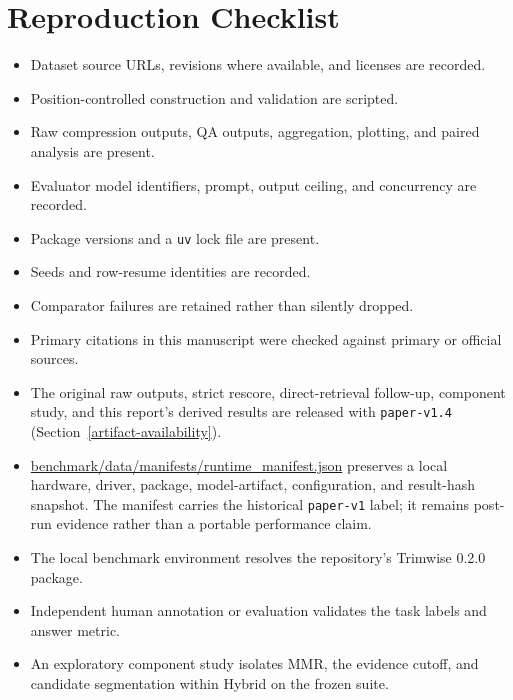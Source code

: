 \documentclass[
]{article}
\providecommand{\tightlist}{%
  \setlength{\itemsep}{0pt}\setlength{\parskip}{0pt}}
\begin{document}
\section{Reproduction Checklist}\label{reproduction-checklist}

\begin{itemize}
\tightlist
\item[$\boxtimes$]
  Dataset source URLs, revisions where available, and licenses are
  recorded.
\item[$\boxtimes$]
  Position-controlled construction and validation are scripted.
\item[$\boxtimes$]
  Raw compression outputs, QA outputs, aggregation, plotting, and paired
  analysis are present.
\item[$\boxtimes$]
  Evaluator model identifiers, prompt, output ceiling, and concurrency
  are recorded.
\item[$\boxtimes$]
  Package versions and a \texttt{uv} lock file are present.
\item[$\boxtimes$]
  Seeds and row-resume identities are recorded.
\item[$\boxtimes$]
  Comparator failures are retained rather than silently dropped.
\item[$\boxtimes$]
  Primary citations in this manuscript were checked against primary or
  official sources.
\item[$\boxtimes$]
  The original raw outputs, strict rescore, direct-retrieval follow-up, component
  study, and
  this report's derived results are released with \texttt{paper-v1.4}
  (Section~\ref{artifact-availability}).
\item[$\boxtimes$]
  \url{benchmark/data/manifests/runtime_manifest.json} preserves a local
  hardware, driver, package, model-artifact, configuration, and result-hash
  snapshot. The manifest carries the historical \texttt{paper-v1} label;
  it remains post-run evidence rather than a portable performance claim.
\item[$\boxtimes$]
  The local benchmark environment resolves the repository's Trimwise
  0.2.0 package.
\item[$\square$]
  Independent human annotation or evaluation validates the task labels
  and answer metric.
\item[$\square$]
  An exploratory component study isolates MMR, the evidence cutoff, and
  candidate segmentation within Hybrid on the frozen suite.
\end{itemize}


\end{document}
